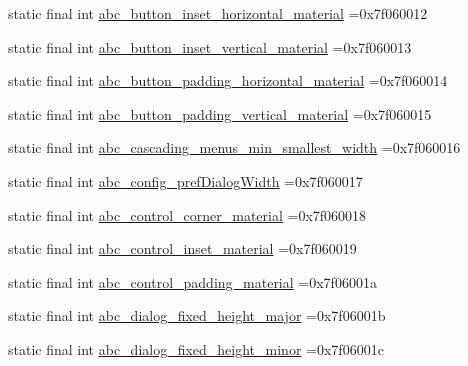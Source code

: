 \begin{DoxyCompactItemize}
static final int \mbox{\hyperlink{classbr_1_1unb_1_1cic_1_1mp_1_1marketmaster_1_1R_1_1dimen_a8aa58ce827113076b2d34dcb30ddafe5}{abc\+\_\+button\+\_\+inset\+\_\+horizontal\+\_\+material}} =0x7f060012
\item 
static final int \mbox{\hyperlink{classbr_1_1unb_1_1cic_1_1mp_1_1marketmaster_1_1R_1_1dimen_a25b479d2ff95801724fb3a9cb9417ba1}{abc\+\_\+button\+\_\+inset\+\_\+vertical\+\_\+material}} =0x7f060013
\item 
static final int \mbox{\hyperlink{classbr_1_1unb_1_1cic_1_1mp_1_1marketmaster_1_1R_1_1dimen_abb28987018566502d39eb00879d50bbb}{abc\+\_\+button\+\_\+padding\+\_\+horizontal\+\_\+material}} =0x7f060014
\item 
static final int \mbox{\hyperlink{classbr_1_1unb_1_1cic_1_1mp_1_1marketmaster_1_1R_1_1dimen_afc2098921f1c99aecdc02c8b50c87dea}{abc\+\_\+button\+\_\+padding\+\_\+vertical\+\_\+material}} =0x7f060015
\item 
static final int \mbox{\hyperlink{classbr_1_1unb_1_1cic_1_1mp_1_1marketmaster_1_1R_1_1dimen_ae7b4c759e416e8e80d29a26d25a35fab}{abc\+\_\+cascading\+\_\+menus\+\_\+min\+\_\+smallest\+\_\+width}} =0x7f060016
\item 
static final int \mbox{\hyperlink{classbr_1_1unb_1_1cic_1_1mp_1_1marketmaster_1_1R_1_1dimen_a5ab723502f95d42387a9ebb3fc71ed20}{abc\+\_\+config\+\_\+pref\+Dialog\+Width}} =0x7f060017
\item 
static final int \mbox{\hyperlink{classbr_1_1unb_1_1cic_1_1mp_1_1marketmaster_1_1R_1_1dimen_a8c229d9d87427e89de6d746609d5e575}{abc\+\_\+control\+\_\+corner\+\_\+material}} =0x7f060018
\item 
static final int \mbox{\hyperlink{classbr_1_1unb_1_1cic_1_1mp_1_1marketmaster_1_1R_1_1dimen_ab8cdf2a5cb311417f389a899407135f0}{abc\+\_\+control\+\_\+inset\+\_\+material}} =0x7f060019
\item 
static final int \mbox{\hyperlink{classbr_1_1unb_1_1cic_1_1mp_1_1marketmaster_1_1R_1_1dimen_a3ee47a19196d44f2c9da670a4477f86a}{abc\+\_\+control\+\_\+padding\+\_\+material}} =0x7f06001a
\item 
static final int \mbox{\hyperlink{classbr_1_1unb_1_1cic_1_1mp_1_1marketmaster_1_1R_1_1dimen_a95f1380091d8f110757f7e5430049f4e}{abc\+\_\+dialog\+\_\+fixed\+\_\+height\+\_\+major}} =0x7f06001b
\item 
static final int \mbox{\hyperlink{classbr_1_1unb_1_1cic_1_1mp_1_1marketmaster_1_1R_1_1dimen_a509339a70435ee54699abf27b4dc555d}{abc\+\_\+dialog\+\_\+fixed\+\_\+height\+\_\+minor}} =0x7f06001c
\item 

\end{DoxyCompactItemize}
